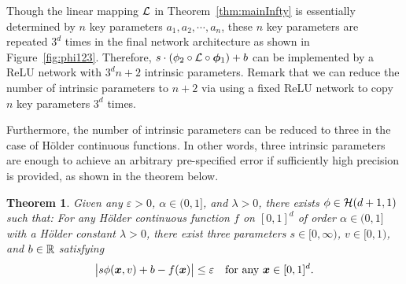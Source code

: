 \documentclass[nohyperref]{article}
\theoremstyle{plain}
\newtheorem{theorem}{Theorem}[section]
\newtheorem{corollary}[theorem]{Corollary}
\theoremstyle{definition}
\theoremstyle{remark}
\begin{document}
Though the linear mapping ${\mathcal{L}}$ in Theorem~\ref{thm:mainInfty} is essentially determined by $n$ key parameters $a_1,a_2,\cdots,a_n$, these $n$ key parameters are repeated $3^d$ times in the final network architecture as shown in Figure~\ref{fig:phi123}. Therefore, $s\cdot(\phi_2\circ {\mathcal{L}} \circ{\bm{\phi}}_1)+b$ can be implemented by a ReLU network with $3^d n+2$ intrinsic parameters. 
Remark that we can reduce the number of intrinsic parameters to $n+2$ via using a fixed ReLU network to copy $n$ key parameters $3^d$ times. 


Furthermore, the number of intrinsic parameters can be reduced to three in the case of H\"older continuous functions. In other words, three intrinsic parameters are enough to achieve an arbitrary pre-specified error if sufficiently high precision is provided, as shown in the theorem below.



\begin{theorem}%
	\label{thm:main:three:parameters}
	Given any $\varepsilon>0$, $\alpha\in (0,1]$, and $\lambda>0$, there exists $\phi\in{\mathcal{H}}(d+1,1)$  such that: For any H\"older continuous function $f$ on $[0,1]^d$ of order $\alpha\in (0,1]$ with a H\"older constant $\lambda>0$, there exist three parameters $s\in [0,\infty)$, $v\in [0,1)$, and $b\in\R$ satisfying
	\begin{equation*}
		\big|s\phi({\bm{x}},v)+b-f({\bm{x}})\big| \le  \varepsilon\quad \textnormal{for any ${\bm{x}}\in[0,1]^d$.}
	\end{equation*}
\end{theorem}
\end{document}

